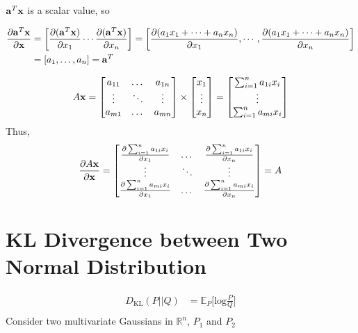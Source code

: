 \begin{appendices}
${\mathbf{a}}^T{\mathbf{x}}$ is a scalar value, so 

\begin{align*}
	\frac{\partial {\mathbf{a}}^T{\mathbf{x}}}{\partial {\mathbf{x}}} &= \bigg[\frac{\partial ({\mathbf{a}}^T{\mathbf{x}})}{\partial x_1} \cdots \frac{\partial ({\mathbf{a}}^T{\mathbf{x}})}{\partial x_n}\bigg] = \bigg[\frac{\partial (a_1x_1+\dots+a_nx_n)}{\partial x_1}, \cdots, \frac{\partial (a_1x_1+\dots+a_nx_n)}{\partial x_n}\bigg]\\ 
	&= [a_1, \dots, a_n] = {\mathbf{a}}^T
\end{align*}

\begin{align*}
	A{\mathbf{x}} = \begin{bmatrix}
		a_{11} & \dots & a_{1n}\\
		\vdots & \ddots & \vdots\\
		a_{m1} & \dots & a_{mn}\\
	\end{bmatrix}\times
	\begin{bmatrix}
		x_1\\
		\vdots\\
		x_n
		\end{bmatrix} = \begin{bmatrix}
		\sum_{i=1}^n a_{1i}x_i\\
		\vdots\\
		\sum_{i=1}^n a_{mi}x_i\\
	\end{bmatrix}
\end{align*}
Thus, 
\begin{align*}
	\frac{\partial A{\mathbf{x}}}{\partial {\mathbf{x}}} =\begin{bmatrix}
		\frac{\partial \sum_{i=1}^n a_{1i}x_i}{\partial x_1}& \dots & \frac{\partial \sum_{i=1}^n a_{1i}x_i}{\partial x_n}\\
		\vdots & \ddots & \vdots\\
		\frac{\partial \sum_{i=1}^n a_{mi}x_i}{\partial x_1} & \dots & \frac{\partial \sum_{i=1}^n a_{mi}x_i}{\partial x_n}
	\end{bmatrix} = A
\end{align*}

\section{KL Divergence between Two Normal Distribution}
\begin{align*}
D_\text{KL}(P||Q) & = \mathbb{E}_P\Big[\textrm{log}\frac{P}{Q}\Big]\\
\end{align*}
Consider two multivariate Gaussians in $\mathbb{R}^n$, $P_1$ and $P_2$


\end{appendices}
